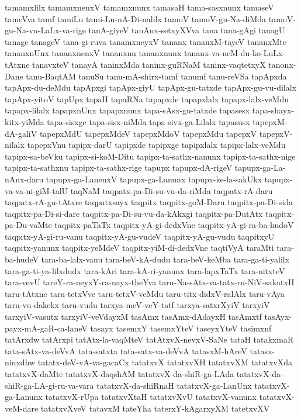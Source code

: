 {tamamxlilx
tamamxnenxV
tamamxnunx
tamasaH
tama-sasxnunx
tamaseV
tameVva
tamf
tamiLu
tami-Lu-nA-Di-nalilx
tamoV
tamoV-gu-Na-diMda
tamoV-gu-Na-vu-LaLx-va-rige
tanA-giyeV
tanAnx-setxyXVva
tana
tana-gAgi
tanagU
tanage
tanageV
tana-gi-ruva
tanamxneyxV
tananx
tananxM-tayeV
tananxMte
tananxnUnx
tananxnenxV
tananxnu
tananxnunx
tananx-va-neM-du-ko-LuLx-tAtxne
tanavxteV
tanayA
taninxMda
taninx-guRNaM
taninx-vaqtetxyX
tanonx-Dane
tanu-BaqtAM
tanuSu
tanu-mA-shirx-tamf
tanumf
tanu-reVSa
tapApxda
tapApx-du-deMdu
tapApxgi
tapApx-giyU
tapApx-gu-tatxde
tapApx-gu-vu-dilalx
tapApx-yitoV
tapUpx
tapaH
tapaRNa
tapapxde
tapapxlalx
tapapx-lalx-veMdu
tapapx-lilalx
tapapxnUnx
tapapxnunx
tapa-sAsx-gu-tatxde
tapasesx
tapa-shayx-kitx-yiMda
tapa-sisxge
tapa-sisx-niMda
tapa-sivx-ga-Lilalx
tapasusx
tapepxM-dA-galiV
tapepxMdU
tapepxMdeV
tapepxMdoV
tapepxMdu
tapepxV
tapepxV-nilalx
tapepxVnu
tapipx-darU
tapipxde
tapipxge
tapipxlalx
tapipx-lalx-veMdu
tapipx-sa-beVku
tapipx-si-koM-Ditu
tapipx-ta-sathx-nanunx
tapipx-ta-sathx-nige
tapipx-ta-sathxnu
tapipx-ta-sathx-rige
tapupx
tapupx-dA-rigeV
tapupx-ga-La-nAnx-daru
tapupx-ga-LanenxV
tapupx-ga-Lanunx
tapupx-ke-la-sakUkx
tapupx-va-va-ni-giM-talU
taqNaM
taqpatx-pa-Di-su-vu-da-riMda
taqpatx-rA-daru
taqpatx-rA-gu-tAtxre
taqpatxsayx
taqpitx
taqpitx-goM-Daru
taqpitx-pa-Di-sida
taqpitx-pa-Di-si-dare
taqpitx-pa-Di-su-vu-da-kAkxgi
taqpitx-pa-DutAtx
taqpitx-pa-Du-vaMte
taqpitx-paTaTx
taqpitx-yA-gi-dedxVne
taqpitx-yA-gi-ra-ba-hudoV
taqpitx-yA-gi-ru-vanu
taqpitx-yA-gu-vudeV
taqpitx-yA-gu-vudu
taqpitxyU
taqpitx-yanunx
taqpitx-yeMdeV
taqpitx-yiM-di-dedxVne
taqtiVyA
taraMti
tara-ba-hudeV
tara-ba-lalx-vanu
tara-beV-kA-dudu
tara-beV-keMba
tara-ga-ti-yalilx
tara-ga-ti-ya-lilxdudx
tara-kAri
tara-kA-ri-yanunx
tara-lapxTaTx
tara-nitxteV
tara-vevU
tareY-ra-neyxY-ra-nayx-theYva
taru-Na-sAtx-va-tatx-ru-NiV-sakatxH
taru-tAtxne
taru-tetxVve
taru-tetxV-veMdu
taru-titx-didxV-ralAlx
taru-vAya
taru-vu-dakekx
taru-vudu
tarxya-meV-veY-tatf
tarxya-satxrXyiV
tarxyiV
tarxyiV-vasutx
tarxyiV-veVdayxM
tasAmx
tasAmx-dAdayxH
tasAmxtf
tasAyx-payx-mA-gaR-ca-laneV
tasayx
tasemxY
tasemxYteV
taseyxYteV
tasimxnf
tatArxdw
tatArxpi
tatAtx-la-vaqMteV
tatAtxvX-nevxV-SaNe
tataH
tatakxmaR
tata-sAtx-va-deVvA
tata-satxta
tata-satx-va-deVvA
tatasxM-hAreV
tatasx-ninxdhw
tatatx-deV-vA-va-gacaCx
tatatxvX
tatatxvXH
tatatxvXM
tatatxvXda
tatatxvX-daMte
tatatxvX-daqshAM
tatatxvX-da-shiR-ga-LAda
tatatxvX-da-shiR-ga-LA-gi-ru-va-vara
tatatxvX-da-shiRnaH
tatatxvX-ga-LanUnx
tatatxvX-ga-Lanunx
tatatxvX-rUpa
tatatxvXtaH
tatatxvXvU
tatatxvX-vanunx
tatatxvX-veM-dare
tatatxvXveV
tatavxM
tateYha
taterxY-kAgarxyXM
tatetxvXV
}
